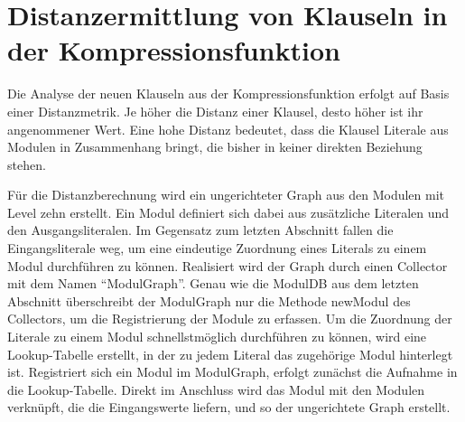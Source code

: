 \section{Distanzermittlung von Klauseln in der Kompressionsfunktion}
\label{sec:ana:distance}

Die Analyse der neuen Klauseln aus der Kompressionsfunktion erfolgt auf Basis einer Distanzmetrik. Je höher die Distanz einer Klausel, desto höher
ist ihr angenommener Wert. Eine hohe Distanz bedeutet, dass die Klausel Literale aus Modulen in Zusammenhang bringt, die bisher in keiner direkten
Beziehung stehen.

Für die Distanzberechnung wird ein ungerichteter Graph aus den Modulen mit Level zehn erstellt. Ein Modul definiert sich dabei aus zusätzliche Literalen
und den Ausgangsliteralen. Im Gegensatz zum letzten Abschnitt fallen die Eingangsliterale weg, um eine eindeutige Zuordnung eines Literals zu einem
Modul durchführen zu können. Realisiert wird der Graph durch einen Collector mit dem Namen "`ModulGraph"'. Genau wie die ModulDB aus dem letzten Abschnitt
überschreibt der ModulGraph nur die Methode newModul des Collectors, um die Registrierung der Module zu erfassen. Um die Zuordnung der Literale zu einem
Modul schnellstmöglich durchführen zu können, wird eine Lookup-Tabelle erstellt, in der zu jedem Literal das zugehörige Modul hinterlegt ist. Registriert
sich ein Modul im ModulGraph, erfolgt zunächst die Aufnahme in die Lookup-Tabelle. Direkt im Anschluss wird das Modul mit den Modulen verknüpft, die die
Eingangswerte liefern, und so der ungerichtete Graph erstellt.

